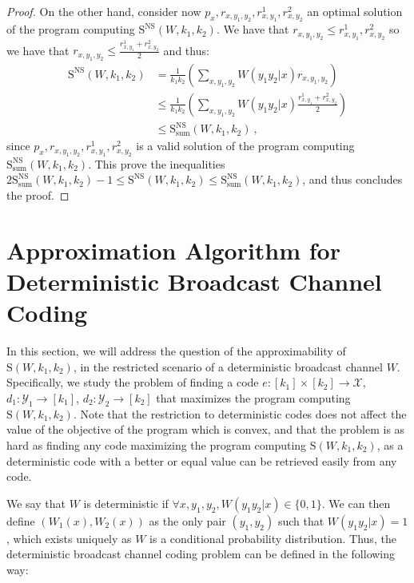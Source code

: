 \begin{proof}
  On the other hand, consider now $p_x,r_{x,y_1,y_2},r^1_{x,y_1},r^2_{x,y_2}$ an optimal solution of the program computing $\mathrm{S}^{\mathrm{NS}}(W,k_1,k_2)$. We have that $r_{x,y_1,y_2} \leq r^1_{x,y_1},r^2_{x,y_2}$ so we have that $r_{x,y_1,y_2} \leq \frac{r^1_{x,y_1}+r^2_{x,y_2}}{2}$ and thus:
  \begin{equation}
    \begin{aligned}
      \mathrm{S}^{\mathrm{NS}}(W,k_1,k_2) &= \frac{1}{k_1k_2}\left(\sum_{x,y_1,y_2} W(y_1y_2|x)r_{x,y_1,y_2}\right)\\
      &\leq \frac{1}{k_1k_2}\left(\sum_{x,y_1,y_2} W(y_1y_2|x)\frac{r^1_{x,y_1}+r^2_{x,y_2}}{2}\right)\\
      &\leq \mathrm{S}_{\text{sum}}^{\mathrm{NS}}(W,k_1,k_2) \ ,
    \end{aligned}
  \end{equation}
  since $p_x,r_{x,y_1,y_2},r^1_{x,y_1},r^2_{x,y_2}$ is a valid solution of the program computing $\mathrm{S}^{\mathrm{NS}}_{\text{sum}}(W,k_1,k_2)$. This prove the inequalities $ 2 \mathrm{S}_{\text{sum}}^{\mathrm{NS}}(W,k_1,k_2)-1 \leq  \mathrm{S}^{\mathrm{NS}}(W,k_1,k_2) \leq \mathrm{S}_{\text{sum}}^{\mathrm{NS}}(W,k_1,k_2)$, and thus concludes the proof.
\end{proof}

\section{Approximation Algorithm for Deterministic Broadcast Channel Coding}
\label{section:ApproxDetBC}
In this section, we will address the question of the approximability of $\mathrm{S}(W,k_1,k_2)$, in the restricted scenario of a deterministic broadcast channel $W$. Specifically, we study the problem of finding a code  $e : [k_1] \times [k_2] \rightarrow \mathcal{X}$, $d_1 : \mathcal{Y}_1 \rightarrow [k_1]$,  $d_2 : \mathcal{Y}_2 \rightarrow [k_2]$ that maximizes the program computing $\mathrm{S}(W,k_1,k_2)$. Note that the restriction to deterministic codes does not affect the value of the objective of the program which is convex, and that the problem is as hard as finding any code maximizing the program computing $\mathrm{S}(W,k_1,k_2)$, as a deterministic code with a better or equal value can be retrieved easily from any code.

We say that $W$ is deterministic if $\forall x,y_1,y_2, W(y_1y_2|x) \in \{0,1\}$. We can then define $(W_1(x),W_2(x))$ as the only pair $(y_1,y_2)$ such that $W(y_1y_2|x)=1$, which exists uniquely as $W$ is a conditional probability distribution. Thus, the deterministic broadcast channel coding problem can be defined in the following way:

